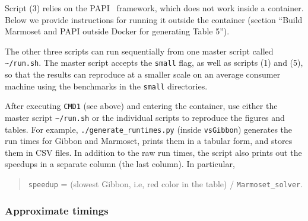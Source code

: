 Script (3) relies on the PAPI~\cite{icl:31} framework, which does not work inside a
container. Below we provide instructions for running it outside the
container (section ``Build Marmoset and PAPI outside Docker for
generating Table 5'').

The other three scripts can run sequentially from one master script
called \texttt{\textasciitilde{}/run.sh}. The master script accepts the
\texttt{small} flag, as well as scripts (1) and (5), so that the results
can reproduce at a smaller scale on an average consumer machine using
the benchmarks in the \texttt{small} directories.

After executing \texttt{CMD1} (see above) and entering the container,
use either the master script \texttt{\textasciitilde{}/run.sh} or the
individual scripts to reproduce the figures and tables. For example,
\texttt{./generate\_runtimes.py} (inside \texttt{vsGibbon}) generates
the run times for Gibbon and Marmoset, prints them in a tabular form,
and stores them in CSV files. In addition to the raw run times, the
script also prints out the speedups in a separate column (the last
column). In particular,

\begin{quote}
\texttt{speedup} = (slowest Gibbon, i.e, red color in the table) /
\texttt{Marmoset\_solver}.
\end{quote}

\hypertarget{approximate-timings}{%
\subsubsection{Approximate timings}\label{approximate-timings}}

